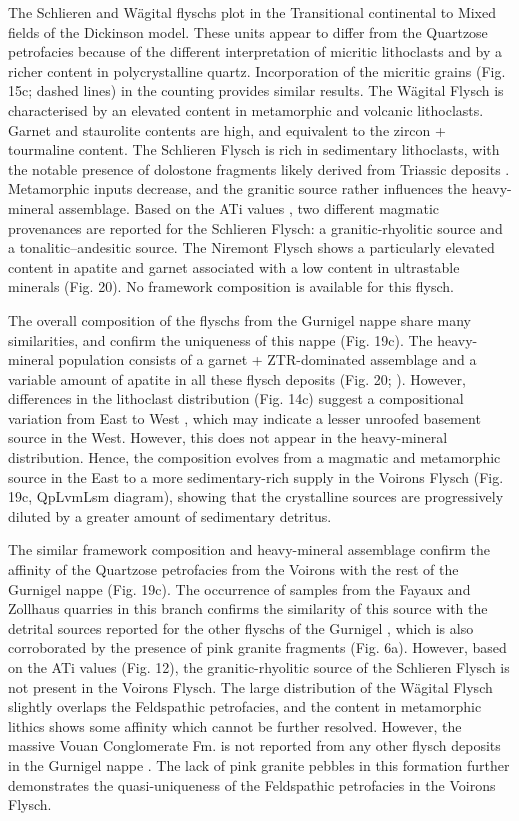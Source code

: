 \documentclass[twoside]{article}
\begin{document}
The Schlieren and Wägital flyschs plot in the Transitional continental to Mixed fields of the Dickinson model. These units appear to differ from the Quartzose petrofacies because of the different interpretation of micritic lithoclasts and by a richer content in polycrystalline quartz. Incorporation of the micritic grains (Fig. 15c; dashed lines) in the counting provides similar results. The Wägital Flysch is characterised by an elevated content in metamorphic and volcanic lithoclasts. Garnet and staurolite contents are high, and equivalent to the zircon + tourmaline content. The Schlieren Flysch is rich in sedimentary lithoclasts, with the notable presence of dolostone fragments likely derived from Triassic deposits \citep{Winkler1983,Winkler1984}. Metamorphic inputs decrease, and the granitic source rather influences the heavy-mineral assemblage. Based on the ATi values \citep{Butler2011}, two different magmatic provenances are reported for the Schlieren Flysch: a granitic-rhyolitic source and a tonalitic–andesitic source. The Niremont Flysch shows a particularly elevated content in apatite and garnet associated with a low content in ultrastable minerals (Fig. 20). No framework composition is available for this flysch.\par
The overall composition of the flyschs from the Gurnigel nappe share many similarities, and confirm the uniqueness of this nappe (Fig. 19c). The heavy-mineral population consists of a garnet + ZTR-dominated assemblage and a variable amount of apatite in all these flysch deposits (Fig. 20; \citealp{Wildi1985}). However, differences in the lithoclast distribution (Fig. 14c) suggest a compositional variation from East to West \citep{Winkler1984}, which may indicate a lesser unroofed basement source in the West. However, this does not appear in the heavy-mineral distribution. Hence, the composition evolves from a magmatic and metamorphic source in the East to a more sedimentary-rich supply in the Voirons Flysch (Fig. 19c, QpLvmLsm diagram), showing that the crystalline sources are progressively diluted by a greater amount of sedimentary detritus.\par
The similar framework composition and heavy-mineral assemblage confirm the affinity of the Quartzose petrofacies from the Voirons with the rest of the Gurnigel nappe (Fig. 19c). The occurrence of samples from the Fayaux and Zollhaus quarries in this branch confirms the similarity of this source with the detrital sources reported for the other flyschs of the Gurnigel \citep{Winkler1983,Winkler1984,Caron1989}, which is also corroborated by the presence of pink granite fragments (Fig. 6a). However, based on the ATi values (Fig. 12), the granitic-rhyolitic source of the Schlieren Flysch \citep{Butler2011} is not present in the Voirons Flysch. The large distribution of the Wägital Flysch slightly overlaps the Feldspathic petrofacies, and the content in metamorphic lithics shows some affinity which cannot be further resolved. However, the massive Vouan Conglomerate Fm. is not reported from any other flysch deposits in the Gurnigel nappe \citep{Caron1989}. The lack of pink granite pebbles in this formation further demonstrates the quasi-uniqueness of the Feldspathic petrofacies in the Voirons Flysch.\par
\end{document}
